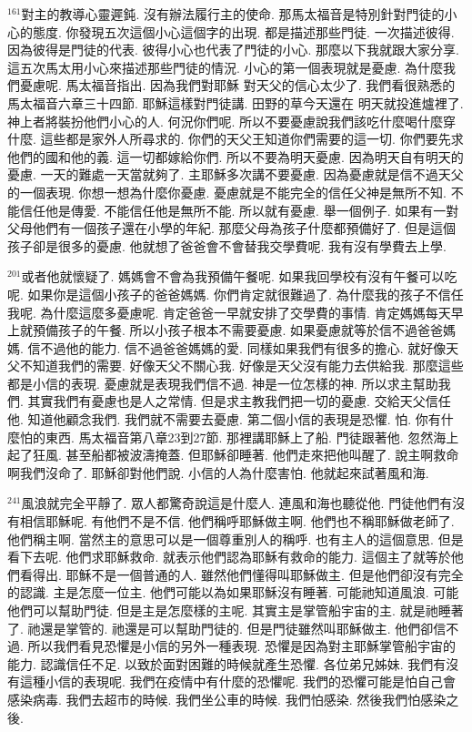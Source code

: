 \documentclass{book}
\begin{document}
$^{161}$對主的教導心靈遲鈍.
沒有辦法履行主的使命.
那馬太福音是特別針對門徒的小心的態度.
你發現五次這個小心這個字的出現.
都是描述那些門徒.
一次描述彼得.
因為彼得是門徒的代表.
彼得小心也代表了門徒的小心.
那麼以下我就跟大家分享.
這五次馬太用小心來描述那些門徒的情況.
小心的第一個表現就是憂慮.
為什麼我們憂慮呢.
馬太福音指出.
因為我們對耶穌 對天父的信心太少了.
我們看很熟悉的馬太福音六章三十四節.
耶穌這樣對門徒講.
田野的草今天還在 明天就投進爐裡了.
神上者將裝扮他們小心的人.
何況你們呢.
所以不要憂慮說我們該吃什麼喝什麼穿什麼.
這些都是家外人所尋求的.
你們的天父王知道你們需要的這一切.
你們要先求他們的國和他的義.
這一切都嫁給你們.
所以不要為明天憂慮.
因為明天自有明天的憂慮.
一天的難處一天當就夠了.
主耶穌多次講不要憂慮.
因為憂慮就是信不過天父的一個表現.
你想一想為什麼你憂慮.
憂慮就是不能完全的信任父神是無所不知.
不能信任他是傳愛.
不能信任他是無所不能.
所以就有憂慮.
舉一個例子.
如果有一對父母他們有一個孩子還在小學的年紀.
那麼父母為孩子什麼都預備好了.
但是這個孩子卻是很多的憂慮.
他就想了爸爸會不會替我交學費呢.
我有沒有學費去上學.

$^{201}$或者他就懷疑了.
媽媽會不會為我預備午餐呢.
如果我回學校有沒有午餐可以吃呢.
如果你是這個小孩子的爸爸媽媽.
你們肯定就很難過了.
為什麼我的孩子不信任我呢.
為什麼這麼多憂慮呢.
肯定爸爸一早就安排了交學費的事情.
肯定媽媽每天早上就預備孩子的午餐.
所以小孩子根本不需要憂慮.
如果憂慮就等於信不過爸爸媽媽.
信不過他的能力.
信不過爸爸媽媽的愛.
同樣如果我們有很多的擔心.
就好像天父不知道我們的需要.
好像天父不關心我.
好像是天父沒有能力去供給我.
那麼這些都是小信的表現.
憂慮就是表現我們信不過.
神是一位怎樣的神.
所以求主幫助我們.
其實我們有憂慮也是人之常情.
但是求主教我們把一切的憂慮.
交給天父信任他.
知道他顧念我們.
我們就不需要去憂慮.
第二個小信的表現是恐懼.
怕.
你有什麼怕的東西.
馬太福音第八章23到27節.
那裡講耶穌上了船.
門徒跟著他.
忽然海上起了狂風.
甚至船都被波濤掩蓋.
但耶穌卻睡著.
他們走來把他叫醒了.
說主啊救命啊我們沒命了.
耶穌卻對他們說.
小信的人為什麼害怕.
他就起來試著風和海.

$^{241}$風浪就完全平靜了.
眾人都驚奇說這是什麼人.
連風和海也聽從他.
門徒他們有沒有相信耶穌呢.
有他們不是不信.
他們稱呼耶穌做主啊.
他們也不稱耶穌做老師了.
他們稱主啊.
當然主的意思可以是一個尊重別人的稱呼.
也有主人的這個意思.
但是看下去呢.
他們求耶穌救命.
就表示他們認為耶穌有救命的能力.
這個主了就等於他們看得出.
耶穌不是一個普通的人.
雖然他們懂得叫耶穌做主.
但是他們卻沒有完全的認識.
主是怎麼一位主.
他們可能以為如果耶穌沒有睡著.
可能祂知道風浪.
可能他們可以幫助門徒.
但是主是怎麼樣的主呢.
其實主是掌管船宇宙的主.
就是祂睡著了.
祂還是掌管的.
祂還是可以幫助門徒的.
但是門徒雖然叫耶穌做主.
他們卻信不過.
所以我們看見恐懼是小信的另外一種表現.
恐懼是因為對主耶穌掌管船宇宙的能力.
認識信任不足.
以致於面對困難的時候就產生恐懼.
各位弟兄姊妹.
我們有沒有這種小信的表現呢.
我們在疫情中有什麼的恐懼呢.
我們的恐懼可能是怕自己會感染病毒.
我們去超市的時候.
我們坐公車的時候.
我們怕感染.
然後我們怕感染之後.
\end{document}
